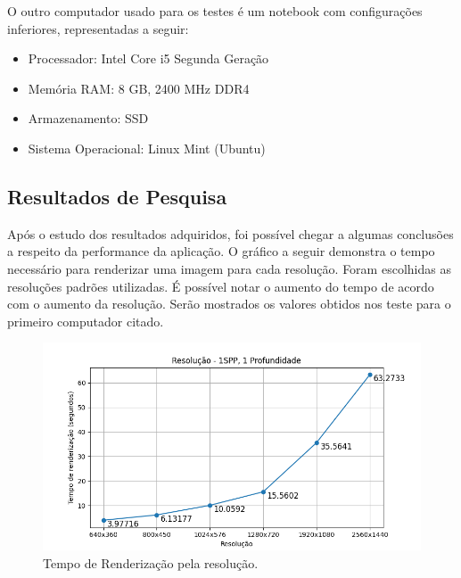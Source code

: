 \documentclass[journal]{IEEEtran}
\begin{document}
O outro computador usado para os testes é um notebook com configurações inferiores, representadas a seguir:

\begin{itemize}
  \item Processador: Intel Core i5 Segunda Geração
  \item Memória RAM: 8 GB, 2400 MHz DDR4
  \item Armazenamento: SSD 
  \item Sistema Operacional: Linux Mint (Ubuntu)
\end{itemize}


\subsection{Resultados de Pesquisa}
Após o estudo dos resultados adquiridos, foi possível chegar a algumas conclusões a respeito
da performance da aplicação. O gráfico a seguir demonstra o tempo necessário para renderizar
uma imagem para cada resolução. Foram escolhidas as resoluções padrões utilizadas. É possível
notar o aumento do tempo de acordo com o aumento da resolução. Serão mostrados os valores obtidos
nos teste para o primeiro computador citado.

\begin{figure}[ht]
  \centering
  \includegraphics[width=\linewidth]{media/Desktop_RES.png}
  \caption{Tempo de Renderização pela resolução.}
  \label{img_desktop_res}
\end{figure}
\end{document}
